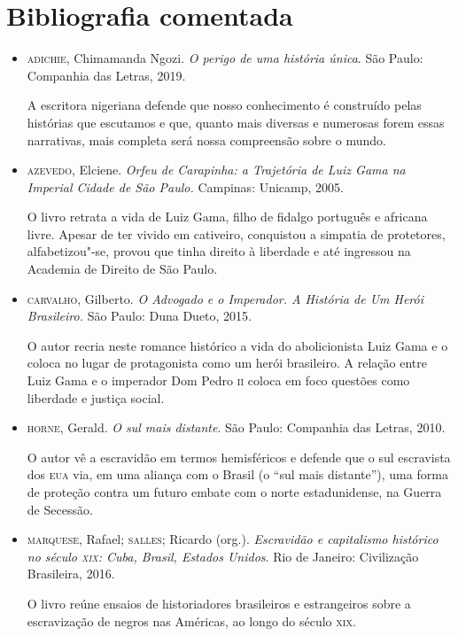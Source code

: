 \documentclass[12pt]{extarticle}
\begin{document}
\section{Bibliografia comentada}

\begin{itemize}
\item\textsc{adichie}, Chimamanda Ngozi. \textit{O perigo de uma história única}.
  São Paulo: Companhia das Letras, 2019.

A escritora nigeriana defende que nosso conhecimento é construído pelas
histórias que escutamos e que, quanto mais diversas e numerosas forem
essas narrativas, mais completa será nossa compreensão sobre o mundo.

\item\textsc{azevedo}, Elciene. \textit{Orfeu de Carapinha: a Trajetória de Luiz Gama na Imperial Cidade de São Paulo.} Campinas: Unicamp, 2005.

O livro retrata a vida de Luiz Gama, filho de fidalgo português e
africana livre. Apesar de ter vivido em cativeiro, conquistou a simpatia
de protetores, alfabetizou"-se, provou que tinha direito à liberdade e
até ingressou na Academia de Direito de São Paulo.

\item\textsc{carvalho}, Gilberto. \textit{O Advogado e o Imperador. A História de Um
Herói Brasileiro.} São Paulo: Duna Dueto, 2015.

O autor recria neste romance histórico a vida do abolicionista Luiz Gama
e o coloca no lugar de protagonista como um herói brasileiro. A relação
entre Luiz Gama e o imperador Dom Pedro \textsc{ii} coloca em foco questões como
liberdade e justiça social.

\item\textsc{horne}, Gerald. \textit{O sul mais distante}. São Paulo: Companhia das
  Letras, 2010.

O autor vê a escravidão em termos hemisféricos e defende que o sul
escravista dos \textsc{eua} via, em uma aliança com o Brasil (o ``sul mais
distante''), uma forma de proteção contra um futuro embate com o norte
estadunidense, na Guerra de Secessão.

\item\textsc{marquese}, Rafael; \textsc{salles}; Ricardo (org.). \textit{Escravidão e
  capitalismo histórico no século \textsc{xix}: Cuba, Brasil, Estados Unidos}.
  Rio de Janeiro: Civilização Brasileira, 2016.

O livro reúne ensaios de historiadores brasileiros e estrangeiros sobre
a escravização de negros nas Américas, ao longo do século \textsc{xix}.
\end{itemize}
\end{document}
